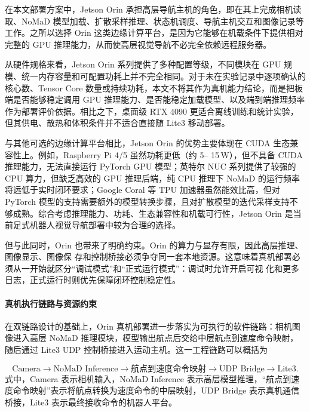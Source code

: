 在本文部署方案中，Jetson Orin 承担高层导航主机的角色，即在其上完成相机读取、NoMaD
模型加载、扩散采样推理、状态机调度、导航主机交互和图像记录等工作。之所以选择 Orin 这类边缘计算平台，是因为它能够在机载条件下提供相对完整的 GPU
推理能力，从而使高层视觉导航不必完全依赖远程服务器。

从硬件规格来看，Jetson Orin 系列提供了多种配置等级，不同模块在 GPU 规模、统一内存容量和可配置功耗上并不完全相同。对于未在实验记录中逐项确认的核心数、Tensor Core 数量或持续功耗，本文不将其作为真机能力结论，而是把板端是否能够稳定调用 GPU 推理能力、是否能稳定加载模型、以及端到端推理频率作为部署评价依据。相比之下，桌面级 RTX 4090 更适合离线训练和统计实验，但其供电、散热和体积条件并不适合直接随 Lite3 移动部署。

与其他可选的边缘计算平台相比，Jetson Orin 的优势主要体现在 CUDA 生态兼容性上。例如，Raspberry Pi 4/5 虽然功耗更低（约 5--
15\,W），但不具备 CUDA 推理能力，无法直接运行 PyTorch GPU 模型；英特尔 NUC 系列提供了较强的 CPU 算力，但缺乏高效的 GPU
推理后端，纯 CPU 推理下 NoMaD 的运行频率将远低于实时闭环要求；Google Coral 等 TPU 加速器虽然能效比高，但对 PyTorch
模型的支持需要额外的模型转换步骤，且对扩散模型的迭代采样支持不够成熟。综合考虑推理能力、功耗、生态兼容性和机载可行性，Jetson Orin
是当前足式机器人视觉导航部署中较为合理的选择。

但与此同时，Orin 也带来了明确约束。Orin 的算力与显存有限，因此高层推理、图像显示、图像保
存和控制桥接必须争夺同一套本地资源。这意味着真机部署必须从一开始就区分``调试模式''和``正式运行模式''：调试时允许开启可视
化和更多日志，正式运行时则优先保障闭环控制稳定性。

\paragraph*{真机执行链路与资源约束}

在双链路设计的基础上，Orin 真机部署进一步落实为可执行的软件链路：相机图像进入高层 NoMaD 推理模块，模型输出航点后交给中层航点到速度命令映射，随后通过 Lite3 UDP 控制桥接进入运动主机。这一工程链路可以概括为

\begin{equation}
\text{Camera} \rightarrow \text{NoMaD Inference} \rightarrow \text{航点到速度命令映射} \rightarrow \text{UDP Bridge} \rightarrow \text{Lite3}.
\end{equation}
式中，Camera 表示相机输入，NoMaD Inference 表示高层模型推理，“航点到速度命令映射”表示将航点转换为速度命令的中层映射，UDP Bridge 表示真机通信桥接，Lite3 表示最终接收命令的机器人平台。

